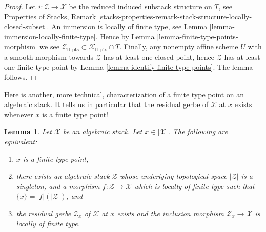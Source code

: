 \documentclass{stacks-project}
\theoremstyle{plain}
\newtheorem{lemma}[subsection]{Lemma}
\theoremstyle{definition}
\theoremstyle{remark}
\numberwithin{equation}{subsection}
\begin{document}
\begin{proof}
Let $i : \mathcal{Z} \to \mathcal{X}$ be the reduced induced substack
structure on $T$, see
Properties of Stacks,
Remark \ref{stacks-properties-remark-stack-structure-locally-closed-subset}.
An immersion is locally of finite type, see
Lemma \ref{lemma-immersion-locally-finite-type}.
Hence by
Lemma \ref{lemma-finite-type-points-morphism}
we see
$\mathcal{Z}_{\text{ft-pts}} \subset \mathcal{X}_{\text{ft-pts}} \cap T$.
Finally, any nonempty affine scheme $U$ with a smooth morphism towards
$\mathcal{Z}$ has at least one closed point, hence $\mathcal{Z}$ has at least
one finite type point by
Lemma \ref{lemma-identify-finite-type-points}.
The lemma follows.
\end{proof}

\noindent
Here is another, more technical, characterization of a finite type
point on an algebraic stack. It tells us in particular that the residual
gerbe of $\mathcal{X}$ at $x$ exists whenever $x$ is a finite type point!

\begin{lemma}
\label{lemma-point-finite-type-monomorphism}
Let $\mathcal{X}$ be an algebraic stack.
Let $x \in |\mathcal{X}|$. The following are equivalent:
\begin{enumerate}
\item $x$ is a finite type point,
\item there exists an algebraic stack $\mathcal{Z}$
whose underlying topological space $|\mathcal{Z}|$ is a singleton,
and a morphism $f : \mathcal{Z} \to \mathcal{X}$ which is
locally of finite type such that $\{x\} = |f|(|\mathcal{Z}|)$, and
\item the residual gerbe $\mathcal{Z}_x$ of $\mathcal{X}$ at $x$ exists
and the inclusion morphism $\mathcal{Z}_x \to \mathcal{X}$ is locally of
finite type.
\end{enumerate}
\end{lemma}
\end{document}
